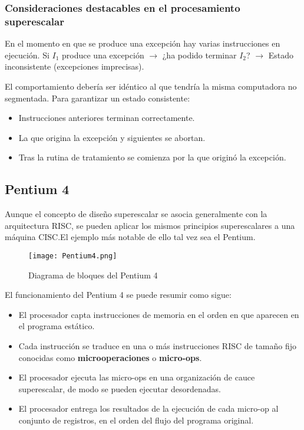 \subsubsection*{Consideraciones destacables en el procesamiento superescalar}

En el momento en que se produce una excepción hay varias instrucciones en ejecución. Si $I_1$ produce una excepción $\to$ ¿ha podido terminar $I_2$? $\to$ Estado inconsistente (excepciones imprecisas).

El comportamiento debería ser idéntico al que tendría la misma computadora no segmentada. Para garantizar un estado consistente:

\begin{itemize}
  \item Instrucciones anteriores terminan correctamente.
  \item La que origina la excepción y siguientes se abortan.
  \item Tras la rutina de tratamiento se comienza por la que originó la excepción.
\end{itemize}

\subsection{Pentium 4}

Aunque el concepto de diseño superescalar se asocia generalmente con la arquitectura RISC, se pueden aplicar los mismos principios superescalares a una máquina CISC.\@ El ejemplo más notable de ello tal vez sea el Pentium.

\begin{figure}[H]
  \centering
  \texttt{[image: Pentium4.png]}
  \caption{Diagrama de bloques del Pentium 4}
\end{figure}

El funcionamiento del Pentium 4 se puede resumir como sigue:

\begin{itemize}
  \item El procesador capta instrucciones de memoria en el orden en que aparecen en el programa estático.
  \item Cada instrucción se traduce en una o más instrucciones RISC de tamaño fijo conocidas como \textbf{microoperaciones} o \textbf{micro-ops}.
  \item El procesador ejecuta las micro-ops en una organización de cauce superescalar, de modo se pueden ejecutar desordenadas.
  \item El procesador entrega los resultados de la ejecución de cada micro-op al conjunto de registros, en el orden del flujo del programa original.
\end{itemize}

